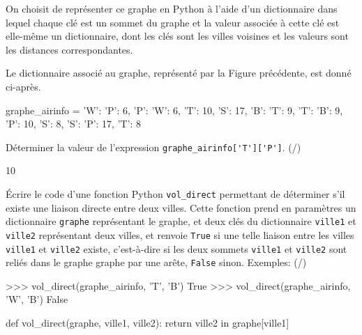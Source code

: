 \smallskip

On choisit de représenter ce graphe en Python à l'aide d'un dictionnaire dans lequel chaque clé est un sommet du graphe et la valeur associée à cette clé est elle-même un dictionnaire, dont les clés sont les villes voisines et les valeurs sont les distances correspondantes.


Le dictionnaire associé au graphe, représenté par la Figure précédente, est donné ci-après.

\begin{CodePythontexAlt}[TaillePolice=\large, Largeur=1\linewidth,Centre,Lignes=true,PremLigne=1]{}
graphe_airinfo = {     
    'W': {'P': 6}, 
    'P': {'W': 6, 'T': 10, 'S': 17}, 
    'B': {'T': 9}, 
    'T': {'B': 9, 'P': 10, 'S': 8}, 
    'S': {'P': 17, 'T': 8}     }
    \end{CodePythontexAlt}

\begin{enumerate}[resume=monDS]
    \begin{minipage}{0.69\linewidth}
            \item Déterminer la valeur de l'expression \verb|graphe_airinfo['T']['P']|. (/)

    \end{minipage}\hfill
    \begin{minipage}{0.29\linewidth}
    \begin{blocvisible}[height=1]
     10
\end{blocvisible}
        \end{minipage}
\item Écrire le code d'une fonction Python \texttt{vol\_direct} permettant de déterminer s'il existe une liaison directe entre deux villes. Cette fonction prend en paramètres un dictionnaire \texttt{graphe} représentant le graphe, et deux clés du dictionnaire \texttt{ville1} et \texttt{ville2} représentant deux villes, et renvoie \texttt{True} si une telle liaison entre les villes \texttt{ville1} et \texttt{ville2} existe, c'est-à-dire si les deux sommets \texttt{ville1} et \texttt{ville2} sont reliés dans le graphe graphe par une arête, \texttt{False} sinon. Exemples: (/)
    \begin{CodePythontexAlt}[TaillePolice=\large, Largeur=1\linewidth,Centre,Lignes=true,PremLigne=1]{}
>>> vol_direct(graphe_airinfo, 'T', 'B') 
True 
>>> vol_direct(graphe_airinfo, 'W', 'B') 
False
    \end{CodePythontexAlt}

\begin{blocvisible}[height=3.5]
\begin{CodePythontexAlt}[TaillePolice=\large, Largeur=1\linewidth,Centre,Lignes=true,PremLigne=1]{}
def vol_direct(graphe, ville1, ville2):
    return ville2 in graphe[ville1]
\end{CodePythontexAlt}
\end{blocvisible}


\end{enumerate}

